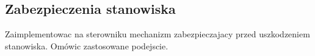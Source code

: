 \subsection{Zabezpieczenia stanowiska}
\label{lab:zad8}



\ifdefined\CompileFigures
%    
\fi

Zaimplementowac na sterowniku mechanizm zabezpieczajacy przed uszkodzeniem stanowiska.
Omówic zastosowane podejscie.

\newpage
